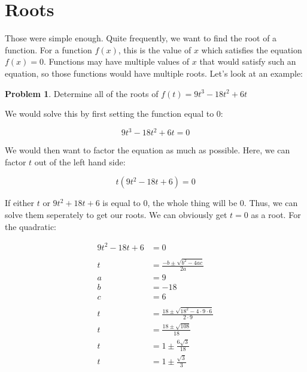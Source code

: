\documentclass[12pt]{article}
\theoremstyle{definition}
\newtheorem{problem}{Problem}
\begin{document}
\section{Roots}
Those were simple enough.
Quite frequently, we want to find the root of a function.
For a function $f(x)$, this is the value of $x$ which satisfies the equation $f(x)=0$.
Functions may have multiple values of $x$ that would satisfy such an equation, so those functions would have multiple roots.
Let's look at an example:

\begin{problem}
Determine all of the roots of $f(t) = 9t^3 - 18t^2 + 6t$
\end{problem}

We would solve this by first setting the function equal to 0:

\begin{equation}
    9t^3 - 18t^2 + 6t = 0
\end{equation}


We would then want to factor the equation as much as possible.
Here, we can factor $t$ out of the left hand side:

\begin{equation}
    t(9t^2 - 18t + 6) = 0
\end{equation}

If either $t$ or $9t^2 + 18t + 6$ is equal to $0$, the whole thing will be $0$.
Thus, we can solve them seperately to get our roots.
We can obviously get $t=0$ as a root.
For the quadratic:

\begin{align}
    9t^2 - 18t + 6 & = 0                                                \\
    \nonumber                                                           \\
    t              & = \frac{-b\pm\sqrt{b^2-4ac}}{2a}                   \\
    a              & = 9                                                \\
    b              & = -18                                              \\
    c              & = 6                                                \\
    \nonumber                                                           \\
    t              & = \frac{18 \pm \sqrt{18^2-4\cdot9\cdot6}}{2\cdot9} \\
    t              & = \frac{18 \pm \sqrt{108}}{18}                     \\
    t              & = 1 \pm \frac{6\sqrt{3}}{18}                       \\
    t              & = 1 \pm \frac{\sqrt{3}}{3}
\end{align}
\end{document}
